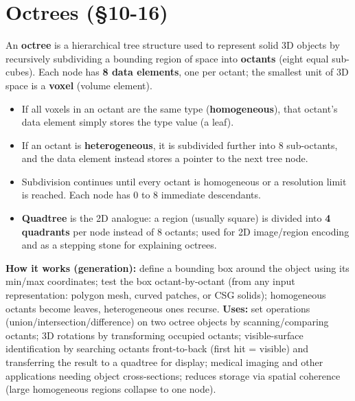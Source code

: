 \documentclass[12pt, a4paper]{article}
\newenvironment{answerbox}{\begin{mdframed}[style=answerframe]}{\end{mdframed}}
\begin{document}
\section{Octrees (\S10-16)}
\begin{answerbox}
An \textbf{octree} is a hierarchical tree structure used to represent solid 3D objects by recursively subdividing a bounding region of space into \textbf{octants} (eight equal sub-cubes). Each node has \textbf{8 data elements}, one per octant; the smallest unit of 3D space is a \textbf{voxel} (volume element).
\begin{itemize}[noitemsep]
  \item If all voxels in an octant are the same type (\textbf{homogeneous}), that octant's data element simply stores the type value (a leaf).
  \item If an octant is \textbf{heterogeneous}, it is subdivided further into 8 sub-octants, and the data element instead stores a pointer to the next tree node.
  \item Subdivision continues until every octant is homogeneous or a resolution limit is reached. Each node has 0 to 8 immediate descendants.
  \item \textbf{Quadtree} is the 2D analogue: a region (usually square) is divided into \textbf{4 quadrants} per node instead of 8 octants; used for 2D image/region encoding and as a stepping stone for explaining octrees.
\end{itemize}
\textbf{How it works (generation):} define a bounding box around the object using its min/max coordinates; test the box octant-by-octant (from any input representation: polygon mesh, curved patches, or CSG solids); homogeneous octants become leaves, heterogeneous ones recurse.
\textbf{Uses:} set operations (union/intersection/difference) on two octree objects by scanning/comparing octants; 3D rotations by transforming occupied octants; visible-surface identification by searching octants front-to-back (first hit = visible) and transferring the result to a quadtree for display; medical imaging and other applications needing object cross-sections; reduces storage via spatial coherence (large homogeneous regions collapse to one node).
\end{answerbox}

\end{document}
